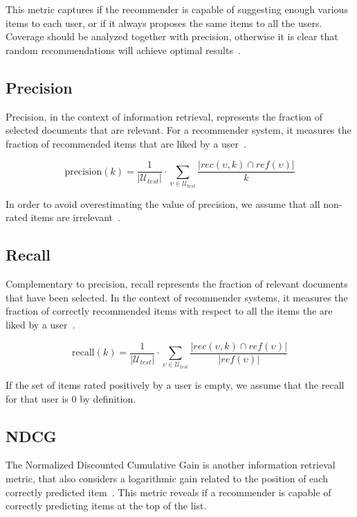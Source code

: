 This metric captures if the recommender is capable of suggesting enough various items to each user, or if it always proposes the same items to all the users. Coverage should be analyzed together with precision, otherwise it is clear that random recommendations will achieve optimal results~\cite{Herlocker2004}.

\subsection{Precision}
Precision, in the context of information retrieval, represents the fraction of selected documents that are relevant. For a recommender system, it measures the fraction of recommended items that are liked by a user~\cite{Sarwar2000}.

\begin{equation*}
\mathrm{precision}(k) = \frac{1}{|\mathcal{U}_{test}|} \cdot \sum_{\upsilon \in \mathcal{U}_{test}} \frac{|rec(\upsilon, k) \cap ref(\upsilon)|}{k}
\end{equation*}

In order to avoid overestimating the value of precision, we assume that all non-rated items are irrelevant~\cite{Steck2013}.

\subsection{Recall}
Complementary to precision, recall represents the fraction of relevant documents that have been selected. In the context of recommender systems, it measures the fraction of correctly recommended items with respect to all the items the are liked by a user~\cite{Sarwar2000}.

\begin{equation*}
\mathrm{recall}(k) = \frac{1}{|\mathcal{U}_{test}|} \cdot \sum_{\upsilon \in \mathcal{U}_{test}} \frac{|rec(\upsilon, k) \cap ref(\upsilon)|}{|ref(\upsilon)|}
\end{equation*}

If the set of items rated positively by a user is empty, we assume that the recall for that user is $0$ by definition.

\subsection{NDCG}
The Normalized Discounted Cumulative Gain is another information retrieval metric, that also considers a logarithmic gain related to the position of each correctly predicted item~\cite{Jaervelin2002}. This metric reveals if a recommender is capable of correctly predicting items at the top of the list.

